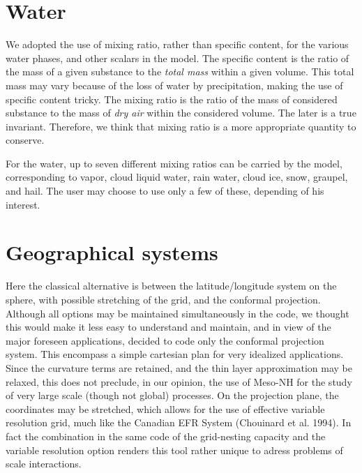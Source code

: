 \section{Water}

We adopted the use of mixing ratio, rather than specific content,
for the various water phases, and other scalars in the model.
The specific content is the ratio of the mass of a given substance to
the {\em total mass} within a given volume.
This total mass may vary because of the
loss of water by precipitation, making the use of specific content tricky.
The mixing ratio is the ratio of the mass of considered substance to the
mass of {\em dry air}
 within the considered volume. The later is a true invariant.
Therefore, we think that mixing ratio is a more appropriate quantity to
conserve.

For the water, up to seven different mixing ratios can be carried
by the model, corresponding to vapor, cloud liquid water, rain water, cloud ice,
snow, graupel, and hail. The user may choose to use only a few of these,
depending of his interest.

\section{Geographical systems}
Here the classical alternative is between the latitude/longitude system on the
sphere, with possible stretching of the grid, and the conformal projection.
Although all options may be maintained simultaneously in the code, we
thought this would make it less easy to understand and maintain, and in view
of the major foreseen applications, decided to code only the conformal
projection system. This encompass a simple cartesian plan for very idealized
applications. Since the curvature terms are retained, and the thin layer
approximation may be relaxed, this does not preclude, in our opinion, the
use of Meso-NH for the study of very large scale (though not global)
processes. On the projection plane, the coordinates may be stretched,
which allows for the use of effective variable resolution grid, much like
the Canadian EFR System (Chouinard et al. 1994).
In fact the combination in the same code of the
grid-nesting capacity and the variable resolution option renders this tool
rather unique to adress problems of scale interactions.

